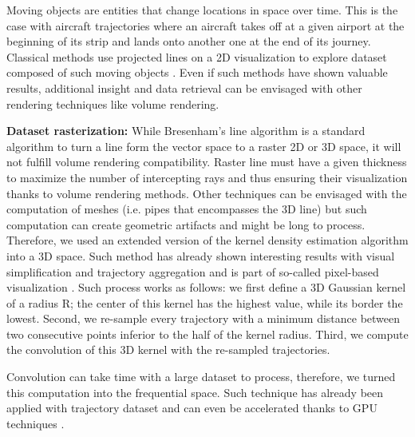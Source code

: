 
Moving objects are entities that change locations in space over time. This is the case with aircraft trajectories where an aircraft takes off at a given airport at the beginning of its strip and lands onto another one at the end of its journey. Classical methods use projected lines on a 2D visualization to explore dataset composed of such moving objects \cite{hurter2014interactive}. Even if such methods have shown valuable results, additional insight and data retrieval can be envisaged with other rendering techniques like volume rendering.

\textbf{Dataset rasterization:} While Bresenham's line algorithm is a standard algorithm to turn a line form the vector space to a raster 2D or 3D space, it will not fulfill volume rendering compatibility. Raster line must have a given thickness to maximize the number of intercepting rays and thus ensuring their visualization thanks to volume rendering methods. Other techniques can be envisaged with the computation of meshes (i.e. pipes that encompasses the 3D line) but such computation can create geometric artifacts and might be long to process. Therefore, we used an extended version of the kernel density estimation algorithm \cite{ silverman1986density} into a 3D space. Such method has already shown interesting results with visual simplification and trajectory aggregation \cite{hurter2012graph} and is part of so-called pixel-based visualization \cite{hurter2015image}.
Such process works as follows: we first define a 3D Gaussian kernel of a radius R; the center of this kernel has the highest value, while its border the lowest. Second, we re-sample every trajectory with a minimum distance between two consecutive points inferior to the half of the kernel radius. Third, we compute the convolution of this 3D kernel with the re-sampled trajectories.

Convolution can take time with a large dataset to process, therefore, we turned this computation into the frequential space. Such technique has already been applied with trajectory dataset and can even be accelerated thanks to GPU techniques \cite{lhuillier2017ffteb}.
